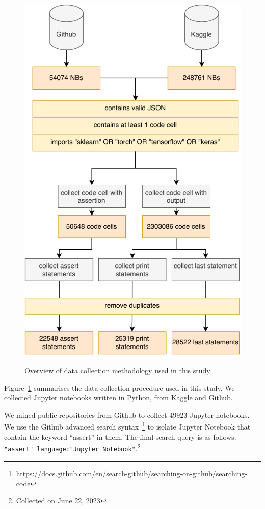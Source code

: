 \begin{figure}
  \centering
  \includegraphics[width=\linewidth]{data-collection.pdf}
  \label{fig:data-collection}
  \caption{Overview of data collection methodology used in this study}
\end{figure}

Figure~\ref{fig:data-collection} summarises the data collection procedure used in this study. We collected Jupyter notebooks written in Python, from Kaggle and Github. 

We mined public repositories from Github to collect $49923$ Jupyter notebooks. We use the Github advanced search syntax~\footnote{https://docs.github.com/en/search-github/searching-on-github/searching-code} to isolate Jupyter Notebook that contain the keyword ``assert'' in them. The final search query is as follows: \texttt{"assert" language:"Jupyter Notebook"}.\footnote{Collected on June 22, 2023}

